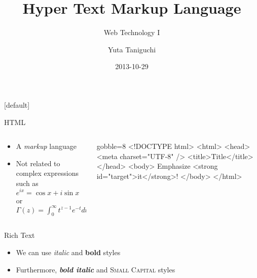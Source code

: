 \documentclass[14pt]{beamer}
\title{Hyper Text Markup Language}
\subtitle{Web Technology I}
\author{Yuta Taniguchi}
\institute{@yuttieyuttie}
\date{2013-10-29}
\begin{document}
{%
  [default]
  \frame{\titlepage}
}
\setcounter{framenumber}{0}


\begin{frame}[fragile]{HTML}
  \begin{columns}
    \begin{column}{0.4\textwidth}
      \begin{itemize}
        \item A \emph{markup} language
        \item Not related to complex expressions such as
          $e^{ix} = \cos x + i \sin x$ or
          $\Gamma(z) = \int_0^\infty t^{z-1} e^{-t} dt$
      \end{itemize}
    \end{column}
    \begin{column}{0.6\textwidth}
      \begin{html*}{gobble=8}
        <!DOCTYPE html>
        <html>
          <head>
            <meta charset="UTF-8" />
            <title>Title</title>
          </head>
          <body>
            Emphasize
            <strong id="target">it</strong>!
          </body>
        </html>
      \end{html*}
    \end{column}
  \end{columns}
\end{frame}


\begin{frame}{Rich Text}
  \begin{itemize}
  \item We can use \textit{italic} and \textbf{bold} styles
  \item Furthermore, \textit{\textbf{bold italic}} and \textsc{Small Capital} styles
  \end{itemize}
\end{frame}
\end{document}
